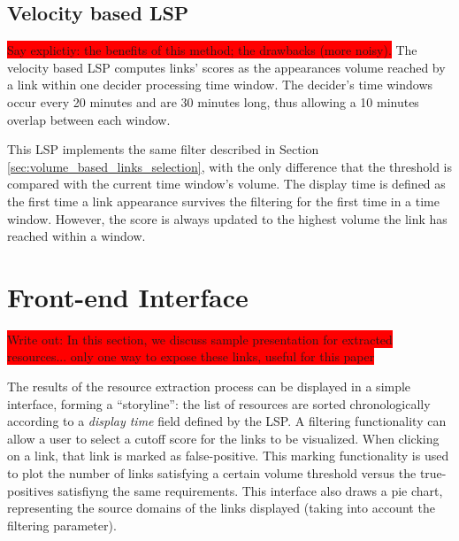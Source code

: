 \documentclass{sig-alternate}
\newcommand{\todo}[1]{\colorbox{red}{#1}}
\begin{document}
\subsection{Velocity based LSP}
\label{sec:velocity_based_links_selection}
\todo{Say explictiy: the benefits of this method; the drawbacks (more noisy).}
The velocity based LSP computes links' scores as the appearances volume reached by a link within one decider processing time window. The decider's time windows occur every 20 minutes and are 30 minutes long, thus allowing a 10 minutes overlap between each window.

This LSP implements the same filter described in Section \ref{sec:volume_based_links_selection}, with the only difference that the threshold is compared with the current time window's volume. The display time is defined as the first time a link appearance survives the filtering for the first time in a time window. However, the score is always updated to the highest volume the link has reached within a window.

\section{Front-end Interface}
\todo{Write out: In this section, we discuss sample presentation for extracted resources... only one way to expose these links, useful for this paper}

The results of the resource extraction process can be displayed in a simple interface, forming a ``storyline'': the list of resources are sorted chronologically according to a \emph{display time} field defined by the LSP. A filtering functionality can allow a user to select a cutoff score for the links to be visualized. When clicking on a link, that link is marked as false-positive. This marking functionality is used to plot the number of links satisfying a certain volume threshold versus the true-positives satisfiyng the same requirements. This interface also draws a pie chart, representing the source domains of the links displayed (taking into account the filtering parameter).
\end{document}
